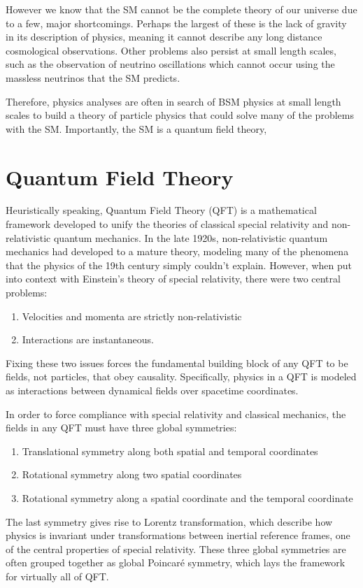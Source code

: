 However we know that the SM cannot be the complete theory of our universe due to a few, major shortcomings. Perhaps the largest of these is the lack of gravity in its description of physics, meaning it cannot describe any long distance cosmological observations. Other problems also persist at small length scales, such as the observation of neutrino oscillations \cite{ref:duan2010collective} which cannot occur using the massless neutrinos that the SM predicts. 

Therefore, physics analyses are often in search of BSM physics at small length scales to build a theory of particle physics that could solve many of the problems with the SM. Importantly, the SM is a quantum field theory, 

\section{Quantum Field Theory}

Heuristically speaking, Quantum Field Theory (QFT)\cite{ref:harlow2024} is a mathematical framework developed to unify the theories of classical special relativity and non-relativistic quantum mechanics. In the late 1920s, non-relativistic quantum mechanics had developed to a mature theory, modeling many of the phenomena that the physics of the 19th century simply couldn't explain. However, when put into context with Einstein's theory of special relativity, there were two central problems: 
\begin{enumerate}
    \item Velocities and momenta are strictly non-relativistic 
    \item Interactions are instantaneous. 
\end{enumerate}
Fixing these two issues forces the fundamental building block of any QFT to be fields, not particles, that obey causality. Specifically, physics in a QFT is modeled as interactions between dynamical fields over spacetime coordinates.

In order to force compliance with special relativity and classical mechanics, the fields in any QFT must have three global symmetries:
\begin{enumerate}
    \item Translational symmetry along both spatial and temporal coordinates
    \item Rotational symmetry along two spatial coordinates
    \item Rotational symmetry along a spatial coordinate and the temporal coordinate
\end{enumerate}
The last symmetry gives rise to Lorentz transformation, which describe how physics is invariant under transformations between inertial reference frames, one of the central properties of special relativity. These three global symmetries are often grouped together as global Poincaré symmetry, which lays the framework for virtually all of QFT.

